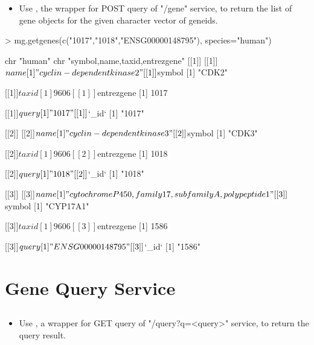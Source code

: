 \documentclass[12pt]{article}
\begin{document}
\begin{itemize}
\item Use , the wrapper for POST query of "/gene" service, to return the list of gene objects for the given character vector of geneids.
\end{itemize} 


\begin{Schunk}
\begin{Sinput}
> mg.getgenes(c("1017","1018","ENSG00000148795"), species="human")
\end{Sinput}
\begin{Soutput}
 chr "human"
 chr "symbol,name,taxid,entrezgene"
[[1]]
[[1]]$name
[1] "cyclin-dependent kinase 2"

[[1]]$symbol
[1] "CDK2"

[[1]]$taxid
[1] 9606

[[1]]$entrezgene
[1] 1017

[[1]]$query
[1] "1017"

[[1]]$`_id`
[1] "1017"


[[2]]
[[2]]$name
[1] "cyclin-dependent kinase 3"

[[2]]$symbol
[1] "CDK3"

[[2]]$taxid
[1] 9606

[[2]]$entrezgene
[1] 1018

[[2]]$query
[1] "1018"

[[2]]$`_id`
[1] "1018"


[[3]]
[[3]]$name
[1] "cytochrome P450, family 17, subfamily A, polypeptide 1"

[[3]]$symbol
[1] "CYP17A1"

[[3]]$taxid
[1] 9606

[[3]]$entrezgene
[1] 1586

[[3]]$query
[1] "ENSG00000148795"

[[3]]$`_id`
[1] "1586"
\end{Soutput}
\end{Schunk}


\section{Gene Query Service}

\subsection{}

\begin{itemize}
\item Use , a wrapper for GET query of "/query?q=<query>" service, to return  the query result.
\end{itemize}
\end{document}
